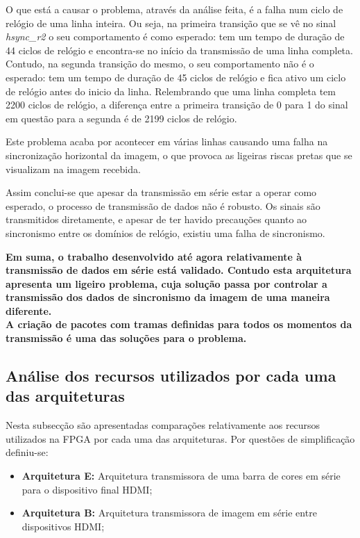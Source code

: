 O que está a causar o problema, através da análise feita, é a falha num ciclo de relógio de uma linha inteira. Ou seja, na primeira transição que se vê no sinal \textit{hsync\_r2} o seu comportamento é como esperado: tem um tempo de duração de 44 ciclos de relógio e encontra-se no início da transmissão de uma linha completa. Contudo, na segunda transição do mesmo, o seu comportamento não é o esperado: tem um tempo de duração de 45 ciclos de relógio e fica ativo um ciclo de relógio antes do inicio da linha. Relembrando que uma linha completa tem 2200 ciclos de relógio, a diferença entre a primeira transição de 0 para 1 do sinal em questão para a segunda é de 2199 ciclos de relógio. 

Este problema acaba por acontecer em várias linhas causando uma falha na sincronização horizontal da imagem, o que provoca as ligeiras riscas pretas que se visualizam na imagem recebida.


Assim conclui-se que apesar da transmissão em série estar a operar como esperado, o processo de transmissão de dados não é robusto. Os sinais são transmitidos diretamente, e apesar de ter havido precauções quanto ao sincronismo entre os domínios de relógio, existiu uma falha de sincronismo.

\begin{center}
	\lrboxbrace[\Vert][\Vert] {} {
\textbf{Em suma, o trabalho desenvolvido até agora relativamente à transmissão de dados em série está validado. Contudo esta arquitetura apresenta um ligeiro problema, cuja solução passa por controlar a transmissão dos dados de sincronismo da imagem de uma maneira diferente. \\ A criação de pacotes com tramas definidas para todos os momentos da transmissão é uma das soluções para o problema.}
}
\end{center}


\subsection{Análise dos recursos utilizados por cada uma das arquiteturas}

Nesta subsecção são apresentadas comparações relativamente aos recursos utilizados na FPGA por cada uma das arquiteturas. Por questões de simplificação definiu-se:
\begin{itemize}
	\item \textbf{Arquitetura E:} Arquitetura transmissora de uma barra de cores em série para o dispositivo final HDMI;
	\item \textbf{Arquitetura B:} Arquitetura transmissora de imagem em série entre dispositivos HDMI;
\end{itemize}

